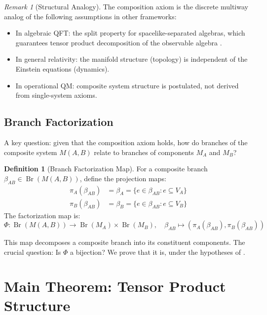 \documentclass[11pt,a4paper]{article}
\theoremstyle{definition}
\newtheorem{definition}[theorem]{Definition}
\theoremstyle{remark}
\newtheorem{remark}[theorem]{Remark}
\DeclareMathOperator{\Br}{Br}
\begin{document}
\begin{remark}[Structural Analogy]
The composition axiom is the discrete multiway analog of the following
assumptions in other frameworks:
\begin{itemize}
\item In algebraic QFT: the split property for spacelike-separated
  algebras, which guarantees tensor product decomposition of the
  observable algebra \cite{haag1992local}.
\item In general relativity: the manifold structure (topology) is
  independent of the Einstein equations (dynamics).
\item In operational QM: composite system structure is postulated, not
  derived from single-system axioms.
\end{itemize}
\end{remark}

\subsection{Branch Factorization}

A key question: given that the composition axiom holds, how do branches
of the composite system $M(A,B)$ relate to branches of components $M_A$
and $M_B$?

\begin{definition}[Branch Factorization Map]
\label{def:factorization_map}
For a composite branch $\beta_{AB} \in \Br(M(A,B))$, define the
projection maps:
\begin{align}
\pi_A(\beta_{AB}) &= \beta_A = \{e \in \beta_{AB} : e \subseteq V_A\} \\
\pi_B(\beta_{AB}) &= \beta_B = \{e \in \beta_{AB} : e \subseteq V_B\}
\end{align}
The factorization map is:
\begin{equation}
\Phi: \Br(M(A,B)) \to \Br(M_A) \times \Br(M_B), \quad
\beta_{AB} \mapsto (\pi_A(\beta_{AB}), \pi_B(\beta_{AB}))
\end{equation}
\end{definition}

This map decomposes a composite branch into its constituent components.
The crucial question: Is $\Phi$ a bijection? We prove that it is, under
the hypotheses of .

\section{Main Theorem: Tensor Product Structure}
\label{sec:tensor}
\end{document}
